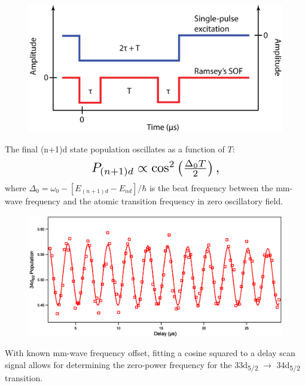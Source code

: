 \documentclass[landscape]{sciposter}
\begin{document}
\begin{multicols}{4}
\begin{figure}
\begin{center}
\includegraphics[scale=1]{Ramsey_excitation.png}
\end{center}
\end{figure}

The final (n+1)d state population oscillates as a function of $T$: 
\begin{equation*}
\resizebox{0.45\hsize}{!}{$P_{(n+1)d} \propto {\cos}^{2}\left(\frac{\Delta_{0} T}{2}\right),$}
\end{equation*}
where $\Delta_0=\omega_0-[E_{(n+1)d}-E_{nd}]/\hbar$ is the beat frequency between the mm-wave frequency and the atomic transition frequency in zero oscillatory field.
 
\begin{figure}
\begin{center}
\includegraphics[scale = 1]{33d52_delay_scans.eps}
\end{center}
\end{figure}

With known mm-wave frequency offset, fitting a cosine squared to a delay scan signal allows for determining the zero-power frequency for the 33d\textsubscript{5/2} $\rightarrow$ 34d\textsubscript{5/2} transition.\\


\end{multicols}
\end{document}
